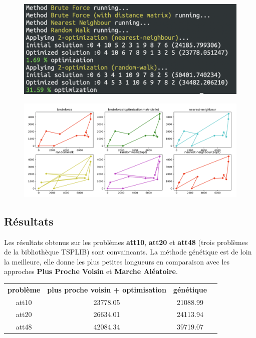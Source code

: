 \documentclass[11pt]{article}
\begin{document}
\begin{figure}[H]
	\centering
		\includegraphics[scale=0.5]{capture_2} \\
\end{figure}
\begin{figure}[H]
	\centering
		\includegraphics[scale=0.25]{capture_3} \\
\end{figure}


\subsection*{Résultats}

Les résultats obtenus sur les problèmes \textbf{att10}, \textbf{att20} et \textbf{att48} (trois problèmes de la bibliothèque TSPLIB) sont convaincants. La méthode génétique est de loin la meilleure, elle donne les plus petites longueurs en comparaison avec les approches \textbf{Plus Proche Voisin} et \textbf{Marche Aléatoire}.\\

\begin{tabular}{ | c | c | c | c | }
	\textbf{problème} & \textbf{plus proche voisin + optimisation} & \textbf{génétique} \\
	att10	& 23778.05 & 21088.99 \\
	att20	& 26634.01 & 24113.94 \\
	att48	& 42084.34 & 39719.07 \\
\end{tabular}
\end{document}
